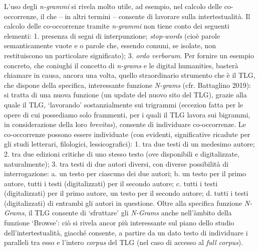 L'uso degli \emph{n-grammi} si rivela molto utile, ad esempio, nel
calcolo delle co-occorrenze, il che -- in altri termini -- consente di
lavorare sulla intertestualità. Il calcolo delle co-occorrenze tramite
\emph{n-grammi} non tiene conto dei seguenti elementi: 1. presenza di
segni di interpunzione; \emph{stop-words} (cioè parole semanticamente
vuote e o parole che, essendo comuni, se isolate, non restituiscono un
particolare significato); 3. \emph{ordo verborum}. Per fornire un
esempio concreto, che coniughi il concetto di \emph{n-grams} e le
digital humanities, basterà chiamare in causa, ancora una volta, quello
straordinario strumento che è il TLG, che dispone della specifica,
interessante funzione \emph{N-grams} (cfr. Battaglino 2019): si tratta
di una nuova funzione (un update del nuovo sito del TLG), grazie alla
quale il TLG, `lavorando' sostanzialmente sui trigrammi (eccezion fatta
per le opere di cui possediamo solo frammenti, per i quali il TLG lavora
sui bigrammi, in considerazione della loro \emph{brevitas}), consente di
individuare co-occorrenze. Le co-occorrenze possono essere individuate
(con evidenti, significative ricadute per gli studi letterari,
filologici, lessicografici): 1. tra due testi di un medesimo autore; 2.
tra due edizioni critiche di uno stesso testo (ove disponibili e
digitalizzate, naturalmente); 3. tra testi di due autori diversi, con
diverse possibilità di interrogazione: a. un testo per ciascuno dei due
autori; b. un testo per il primo autore, tutti i testi (digitalizzati)
per il secondo autore; c. tutti i testi (digitalizzati) per il primo
autore, un testo per il secondo autore; d. tutti i testi (digitalizzati)
di entrambi gli autori in questione. Oltre alla specifica funzione
\emph{N-Grams}, il TLG consente di `sfruttare' gli \emph{N-Grams} anche
nell'àmbito della funzione `Browse': ciò si rivela ancor più
interessante sul piano dello studio dell'intertestualità, giacché
consente, a partire da un dato testo di individuare i paralleli tra esso
e l'intero \emph{corpus} del TLG (nel caso di accesso al \emph{full
corpus}).

